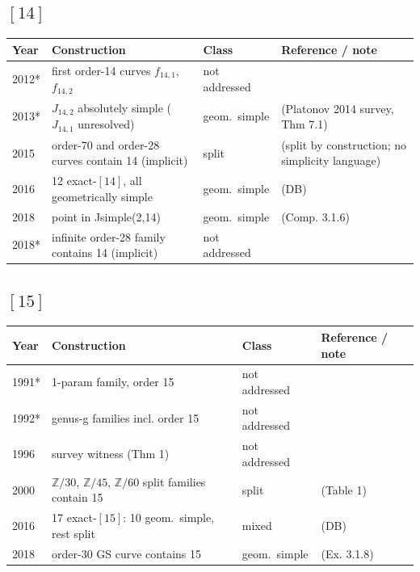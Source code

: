 \documentclass[10pt]{amsart}
\begin{document}
\subsection*{$[14]$}
\begin{longtable}{p{0.9cm} p{7.6cm} p{2.3cm} p{4.2cm}}
\hline Year & Construction & Class & Reference / note \\ \hline
2012* & first order-14 curves $f_{14,1}$, $f_{14,2}$ & not addressed & \cite{PP2012}\\
2013* & $J_{14,2}$ absolutely simple ($J_{14,1}$ unresolved) & geom.\ simple & \cite{PZP2013} (Platonov 2014 survey, Thm 7.1)\\
2015 & order-70 and order-28 curves contain 14 (implicit) & split & \cite{Howe2015} (split by construction; no simplicity language)\\
2016 & 12 exact-$[14]$, all geometrically simple & geom.\ simple & \cite{BSSVY} (DB)\\
2018 & point in Jsimple(2,14) & geom.\ simple & \cite{Nicholls2018} (Comp. 3.1.6)\\
2018* & infinite order-28 family contains 14 (implicit) & not addressed & \cite{PF2018}\\
\hline\end{longtable}
\subsection*{$[15]$}
\begin{longtable}{p{0.9cm} p{7.6cm} p{2.3cm} p{4.2cm}}
\hline Year & Construction & Class & Reference / note \\ \hline
1991* & 1-param family, order 15 & not addressed & \cite{Leprevost1991b}\\
1992* & genus-g families incl. order 15 & not addressed & \cite{Leprevost1992}\\
1996 & survey witness (Thm 1) & not addressed & \cite{Poonen1996}\\
2000 & $\mathbb{Z}/30$, $\mathbb{Z}/45$, $\mathbb{Z}/60$ split families contain 15 & split & \cite{HLP2000} (Table 1)\\
2016 & 17 exact-$[15]$: 10 geom.\ simple, rest split & mixed & \cite{BSSVY} (DB)\\
2018 & order-30 GS curve contains 15 & geom.\ simple & \cite{Nicholls2018} (Ex. 3.1.8)\\
\hline\end{longtable}
\end{document}
